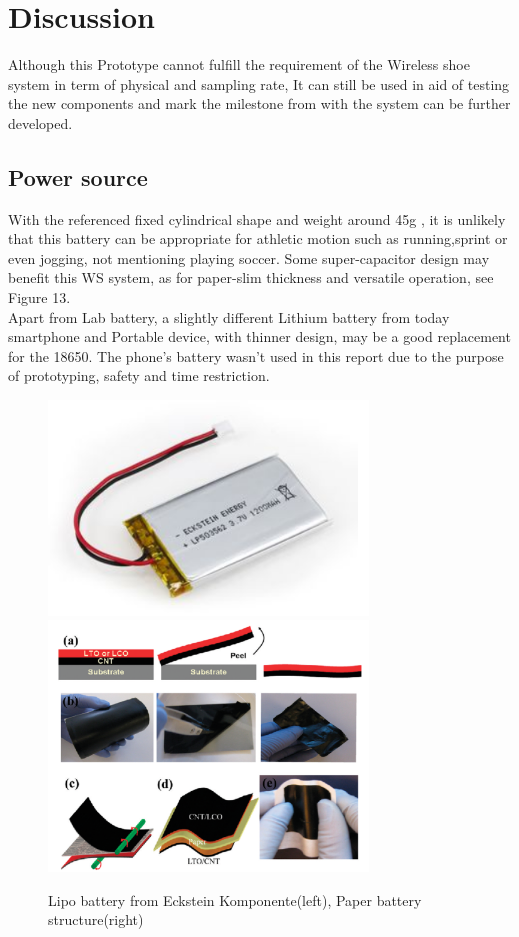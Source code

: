 \documentclass[12pt,a4paper]{article}
\begin{document}
\section{Discussion}
Although this Prototype cannot fulfill the requirement of the Wireless shoe system in term of physical and sampling rate, It can still be used in aid of testing the new components and mark the milestone from with the system can be further developed.
\subsection{Power source}
With the referenced fixed cylindrical shape and weight around 45g \cite{18650}, it is unlikely that this battery can be appropriate for athletic motion such as running,sprint or even jogging, not mentioning playing soccer. Some super-capacitor design \cite{newbat} may benefit this WS system, as for paper-slim thickness and versatile operation, see Figure 13.\\
Apart from Lab battery, a slightly different Lithium battery from today smartphone and Portable device, with thinner design, may be a good replacement for the 18650. The phone's battery wasn't used in this report due to the purpose of prototyping, safety and time restriction.
\begin{figure}[hbt!]
\begin{center}
\includegraphics[width = 85mm]{lipo.png}\hfill
\includegraphics[width = 85mm]{paperbat.png}
\caption{Lipo battery from Eckstein Komponente(left), Paper battery structure(right)\cite{paperbat}}
\end{center} 
\end{figure}
\end{document}
